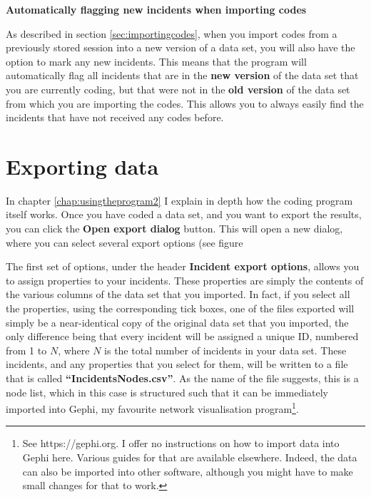 \documentclass{memoir}
\begin{document}
\begin{framed}
\textbf{Automatically flagging new incidents when importing codes}
  
  As described in section \ref{sec:importingcodes}, when you import codes from a previously stored session into a new version of a data set, you will also have the option to mark any new incidents. This means that the program will automatically flag all incidents that are in the \textbf{new version} of the data set that you are currently coding, but that were not in the \textbf{old version} of the data set from which you are importing the codes. This allows you to always easily find the incidents that have not received any codes before. 
\end{framed}

\section{Exporting data}
\label{sec:exportingdata}

In chapter \ref{chap:usingtheprogram2} I explain in depth how the coding program itself works. Once you have coded a data set, and you want to export the results, you can click the \textbf{Open export dialog} button. This will open a new dialog, where you can select several export options (see figure %


The first set of options, under the header \textbf{Incident export options}, allows you to assign properties to your incidents. These properties are simply the contents of the various columns of the data set that you imported. In fact, if you select all the properties, using the corresponding tick boxes, one of the files exported will simply be a near-identical copy of the original data set that you imported, the only difference being that every incident will be assigned a unique ID, numbered from 1 to \(N\), where \(N\) is the total number of incidents in your data set. These incidents, and any properties that you select for them, will be written to a file that is called \textbf{``Incidents\textunderscore Nodes.csv''}. As the name of the file suggests, this is a node list, which in this case is structured such that it can be immediately imported into Gephi, my favourite network visualisation program\footnote{See https://gephi.org. I offer no instructions on how to import data into Gephi here. Various guides for that are available elsewhere. Indeed, the data can also be imported into other software, although you might have to make small changes for that to work.}. 
\end{document}
